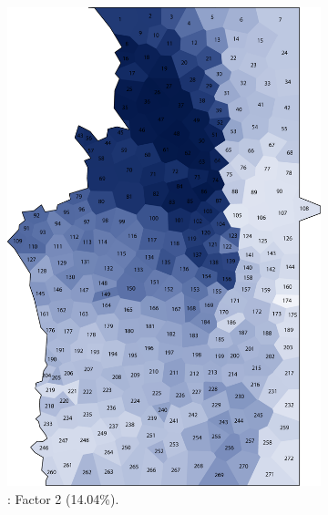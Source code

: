 \documentclass[output=paper]{LSP/langsci}
\begin{document}
\begin{figure}
\centering
\begin{subfigure}[t]{0.3\textwidth}
\includegraphics[width=\textwidth]{illustrations/pickl_fig3}
\caption{: Factor 2 (14.04\%).}
\label{fig:pickl:3}
\end{subfigure}   
~
\begin{subfigure}[t]{0.3\textwidth}

\end{subfigure}
\end{figure}
\end{document}

